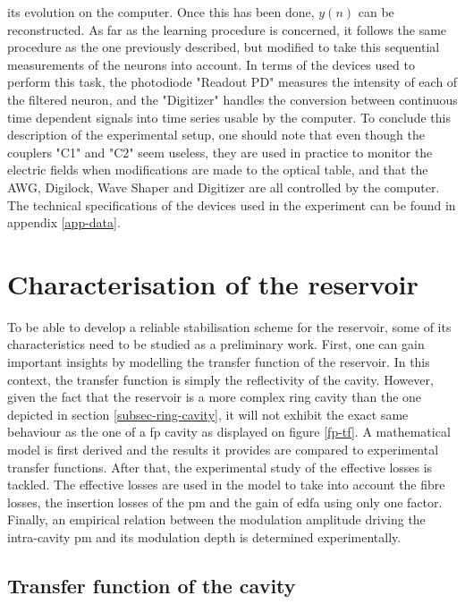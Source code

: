 its evolution on the computer. Once this has been done, $y(n)$ can be reconstructed. As far as the learning procedure is concerned, it follows the same procedure as the one previously described, but modified to take this sequential measurements of the neurons into account. In terms of the devices used to perform this task, the photodiode "Readout PD" measures the intensity of each of the filtered neuron, and the "Digitizer" handles the conversion between continuous time dependent signals into time series usable by the computer. To conclude this description of the experimental setup, one should note that even though the couplers "C1" and "C2" seem useless, they are used in practice to monitor the electric fields when modifications are made to the optical table, and that the AWG, Digilock, Wave Shaper and Digitizer are all controlled by the computer. The technical specifications of the devices used in the experiment can be found in appendix \ref{app-data}.


\section{Characterisation of the reservoir}

To be able to develop a reliable stabilisation scheme for the reservoir, some of its characteristics need to be studied as a preliminary work. First, one can gain important insights by modelling the transfer function of the reservoir. In this context, the transfer function is simply the reflectivity of the cavity. However, given the fact that the reservoir is a more complex ring cavity than the one depicted in section \ref{subsec-ring-cavity}, it will not exhibit the exact same behaviour as the one of a \gls{fp} cavity as displayed on figure \ref{fp-tf}. A mathematical model is first derived and the results it provides are compared to experimental transfer functions. After that, the experimental study of the effective losses is tackled. The effective losses are used in the model to take into account the fibre losses, the insertion losses of the \gls{pm} and the gain of \gls{edfa} using only one factor. Finally, an empirical relation between the modulation amplitude driving the intra-cavity \gls{pm} and its modulation depth is determined experimentally.


\subsection{Transfer function of the cavity}

